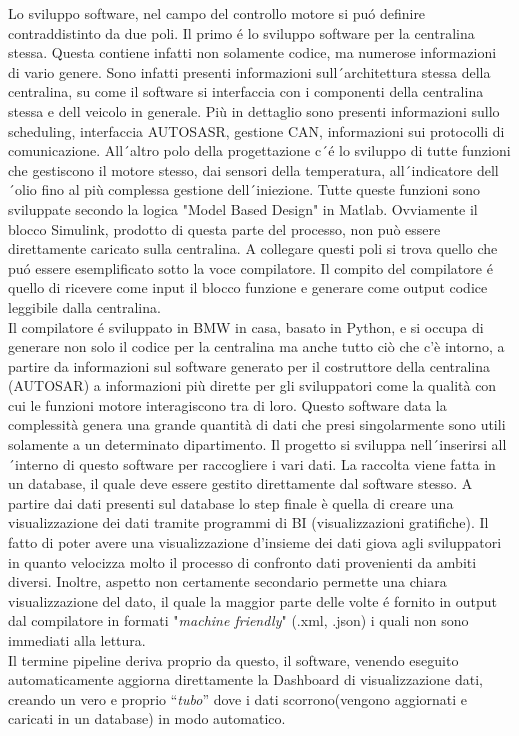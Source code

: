 \documentclass[../main.tex]{subfiles}
\begin{document}
Lo sviluppo software, nel campo del controllo motore si puó definire contraddistinto da due poli. Il primo é lo sviluppo software per la centralina stessa. Questa contiene infatti non solamente codice, ma numerose informazioni di vario genere. Sono infatti presenti informazioni sull´architettura stessa della centralina, su come il software si interfaccia con i componenti della centralina stessa e dell veicolo in generale. Più in dettaglio sono presenti informazioni sullo scheduling, interfaccia AUTOSASR,  gestione CAN, informazioni sui protocolli di comunicazione. All´altro polo della progettazione c´é lo sviluppo di tutte funzioni che  gestiscono il motore stesso, dai sensori della temperatura, all´indicatore dell´olio fino al più complessa gestione dell´iniezione. Tutte queste funzioni sono sviluppate secondo la logica "Model Based Design" in Matlab. Ovviamente il blocco Simulink, prodotto di questa parte del processo, non può essere direttamente caricato sulla centralina. A collegare questi poli si trova quello che puó essere esemplificato sotto la voce compilatore. Il compito del compilatore é quello di ricevere come input il blocco funzione e generare come output codice leggibile dalla centralina.\\ Il compilatore é sviluppato in \gls{BMW} in casa, basato in Python, e si occupa di generare non solo il codice per la centralina ma anche tutto ciò che c'è intorno, a partire da informazioni sul software generato per il costruttore della centralina (AUTOSAR) a informazioni più dirette per gli sviluppatori come la qualità con cui le funzioni motore interagiscono tra di loro. Questo software data la complessità genera una grande quantità di dati che presi singolarmente sono utili solamente a un determinato dipartimento. Il progetto si sviluppa nell´inserirsi all´interno di questo software per raccogliere i vari dati. La raccolta viene fatta in un database, il quale deve essere gestito direttamente dal software stesso. A partire dai dati presenti sul database lo step finale è quella di creare una visualizzazione dei dati tramite programmi di BI (visualizzazioni gratifiche). Il fatto di poter avere una visualizzazione d'insieme dei dati giova agli sviluppatori in quanto velocizza molto il processo di confronto dati provenienti da ambiti diversi. Inoltre, aspetto non certamente secondario permette una chiara visualizzazione del dato, il quale la maggior parte delle volte é fornito in output dal compilatore in formati "\textit{machine friendly}" (.xml, .json) i quali non sono immediati alla lettura.\\Il termine pipeline deriva proprio da questo, il software, venendo eseguito automaticamente aggiorna direttamente la Dashboard di visualizzazione dati, creando un vero e proprio “\textit{tubo}” dove i dati scorrono(vengono aggiornati e caricati in un database) in modo automatico. 

\cleardoublepage
\end{document}
